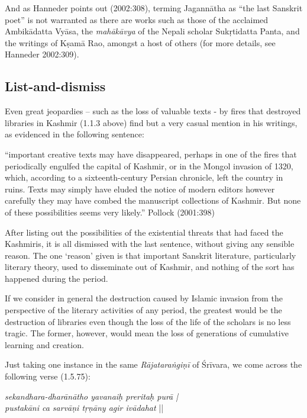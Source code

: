 And as Hanneder points out (2002:308), terming Jagannātha as “the last Sanskrit poet” is not warranted as there are works such as those of the acclaimed Ambikādatta Vyāsa, the {\sl mahākāvya} of the Nepali scholar Sukṛtidatta Panta, and the writings of Kṣamā Rao, amongst a host of others (for more details, see Hanneder 2002:309).

\subsection{List-and-dismiss}

Even great jeopardies – such as the loss of valuable texts - by fires that destroyed libraries in Kashmir (1.1.3 above) find but a very casual mention in his writings, as evidenced in the following sentence:
\begin{myquote}
\eleven
“important creative texts may have disappeared, perhaps in one of the fires that periodically engulfed the capital of Kashmir, or in the Mongol invasion of 1320, which, according to a sixteenth-century Persian chronicle, left the country in ruins. Texts may simply have eluded the notice of modern editors however carefully they may have combed the manuscript collections of Kashmir. But none of these possibilities seems very likely.”	\hfill Pollock (2001:398)
\end{myquote}

After listing out the possibilities of the existential threats that had faced the Kashmiris, it is all dismissed with the last sentence, without giving any sensible reason. The one ‘reason’ given is that important Sanskrit literature, particularly literary theory, used to disseminate out of Kashmir, and nothing of the sort has happened during the period. 

If we consider in general the destruction caused by Islamic invasion from the perspective of the literary activities of any period, the greatest would be the destruction of libraries even though the loss of the life of the scholars is no less tragic. The former, however, would mean the loss of generations of cumulative learning and creation. 

Just taking one instance in the same {\sl Rājataraṅgiṇī} of Śrīvara, we come across the following verse (1.5.75):
\begin{myquote}
{\sl sekandhara-dharānātho yavanaiḥ preritaḥ purā |} \\
{\sl pustakāni ca sarvāṇi tṛṇāny agir ivādahat} || 
\end{myquote}

